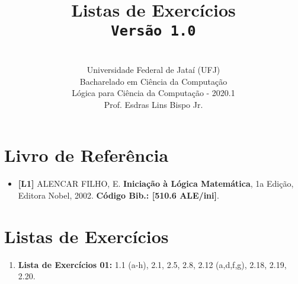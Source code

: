 \documentclass[12pt,a4paper,oneside]{article}
\author{\\Universidade Federal de Jataí (UFJ)\\Bacharelado em Ciência da Computação \\Lógica para Ciência da Computação - 2020.1 \\Prof. Esdras Lins Bispo Jr.}
\date{}
\title{
	\sc \huge Listas de Exercícios
	\\{\tt Versão 1.0}
}
\begin{document}
\maketitle

\section{Livro de Referência}
	\begin{itemize}
		\item  {\bf \color{blue} [L1]} ALENCAR FILHO, E. {\bf Iniciação à Lógica Matemática}, 1a Edição, Editora Nobel, 2002. {\color{blue} \bf Código Bib.: [510.6 ALE/ini]}.
	\end{itemize}
	
\section{Listas de Exercícios}

\begin{enumerate}

	\subsection{Mini-Teste 1}
	\item[] {\bf Lista de Exercícios 01:} 1.1 (a-h), 2.1, 2.5, 2.8, 2.12 (a,d,f,g), 2.18, 2.19, 2.20.
	
%	
	
\end{enumerate}
\end{document}
